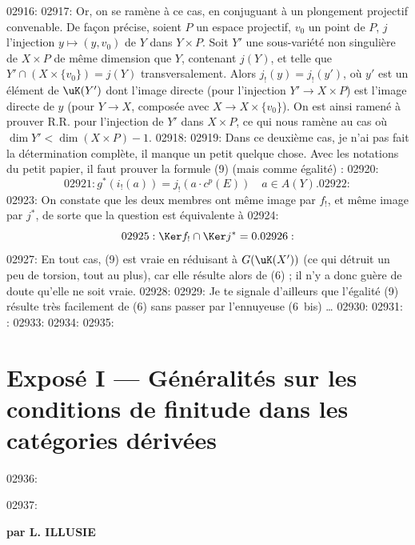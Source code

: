 02916: 
02917: Or, on se ram\`ene \`a ce cas, en conjuguant \`a un plongement projectif convenable. De fa\c{c}on pr\'ecise, soient $P$ un espace projectif, $v_0$ un point de $P$, $j$ l'injection $y \mapsto (y, v_0)$ de $Y$ dans $Y \times P$. Soit $Y'$ une sous-vari\'et\'e non singuli\`ere de $X \times P$ de m\^eme dimension que $Y$, contenant $j(Y)$, et telle que $Y' \cap (X \times \{v_0\}) = j(Y)$ transversalement. Alors $j_!(y) = j_!(y')$, o\`u $y'$ est un \'el\'ement de $\uK(Y')$ dont l'image directe (pour l'injection $Y' \to X \times P$) est l'image directe de $y$ (pour $Y \to X$, compos\'ee avec $X \to X \times \{v_0\}$). On est ainsi ramen\'e \`a prouver R.R. pour l'injection de $Y'$ dans $X \times P$, ce qui nous ram\`ene au cas o\`u $\dim Y' < \dim(X \times P) - 1$.
02918: 
02919: Dans ce deuxi\`eme cas, je n'ai pas fait la d\'etermination compl\`ete, il manque un petit quelque chose. Avec les notations du petit papier, il faut prouver la formule (9) (mais comme \'egalit\'e) :
02920: \begin{equation}\label{eq:rr.9}
02921: g^*(i_!(a)) = j_!(a \cdot c^p(E)) \quad a \in A(Y).
02922: \end{equation}
02923: On constate que les deux membres ont m\^eme image par $f_!$, et m\^eme image par $j^*$, de sorte que la question est \'equivalente \`a
02924: \begin{equation}\label{eq:rr.9bis}
02925: \Ker f_! \cap \Ker j^* = 0.
02926: \end{equation}
02927: En tout cas, (9) est vraie en r\'eduisant \`a $G(\uK(X'))$ (ce qui d\'etruit un peu de torsion, tout au plus), car elle r\'esulte alors de (6) ; il n'y a donc gu\`ere de doute qu'elle ne soit vraie.
02928: 
02929: Je te signale d'ailleurs que l'\'egalit\'e (9) r\'esulte tr\`es facilement de (6) sans passer par l'ennuyeuse (6~bis) \ldots
02930: 
02931: : %
02933: %
02934: %
02935: \section*{Expos\'e I --- G\'en\'eralit\'es sur les conditions de finitude dans les cat\'egories d\'eriv\'ees}
02936: 
02937: \begin{center}\textbf{par L. ILLUSIE}\end{center}
